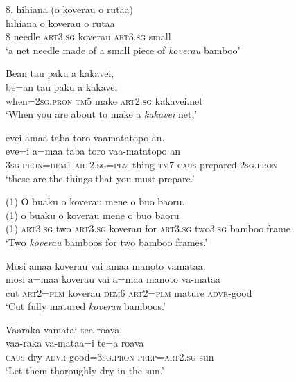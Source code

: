 \ea\label{ex:text22-14}
8. hihiana (o koverau o rutaa)\\
	hihiana	o	koverau	o	rutaa\\
     8	needle	\textsc{art}3.\textsc{sg}	koverau	\textsc{art}3.\textsc{sg}	small\\
\glt `a net needle made of a small piece of \textit{koverau} bamboo'
\z

\ea\label{ex:text22-15}
Bean tau paku a kakavei,\\
\gll be=an	tau	paku	a	kakavei\\
     when=2\textsc{sg}.\textsc{pron}	\textsc{tm}5	make	\textsc{art}2.\textsc{sg}	kakavei.net\\
\glt `When you are about to make a \textit{kakavei} net,'
\z

\ea\label{ex:text22-16}
evei amaa taba toro vaamatatopo an.\\
\gll eve=i	a=maa	taba	toro	vaa-matatopo	an\\
     3\textsc{sg}.\textsc{pron}=\textsc{dem}1	\textsc{art}2.\textsc{sg}=\textsc{plm}	thing	\textsc{tm}7	\textsc{caus}-prepared	2\textsc{sg}.\textsc{pron}\\
\glt `these are the things that you must prepare.'
\z

\ea\label{ex:text22-17}
(1) O buaku o koverau mene o buo baoru.\\
\gll (1)	o	buaku	o	koverau	mene	o	buo	baoru\\
     (1)	\textsc{art}3.\textsc{sg}	two	\textsc{art}3.\textsc{sg}	koverau	for	\textsc{art}3.\textsc{sg}	two3.\textsc{sg}	bamboo.frame\\
\glt `Two \textit{koverau} bamboos for two bamboo frames.'
\z

\ea\label{ex:text22-18}
Mosi amaa koverau vai amaa manoto vamataa.\\
\gll mosi	a=maa	koverau	vai	a=maa	manoto	va-mataa\\
     cut	\textsc{art}2=\textsc{plm}	koverau	\textsc{dem}6	\textsc{art}2=\textsc{plm}	mature	\textsc{advr}-good\\
\glt `Cut fully matured \textit{koverau} bamboos.'
\z

\ea\label{ex:text22-19}
Vaaraka vamatai tea roava.\\
\gll vaa-raka	va-mataa=i	te=a	roava\\
     \textsc{caus}-dry	\textsc{advr}-good=3\textsc{sg}.\textsc{pron}	\textsc{prep}=\textsc{art}2.\textsc{sg}	sun\\
\glt `Let them thoroughly dry in the sun.'
\z

